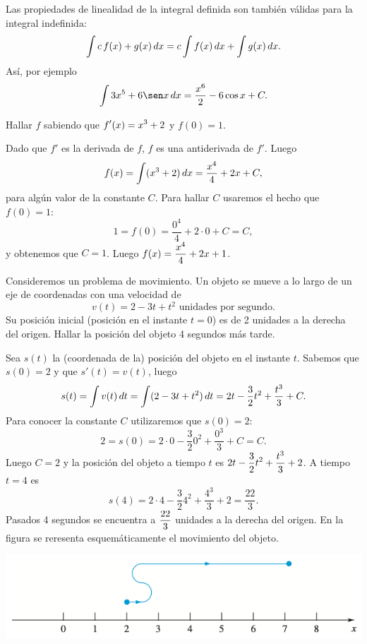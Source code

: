 Las propiedades de linealidad de la integral definida son también válidas para la integral indefinida:
\[
\int c\, f(x)+g(x)\,dx = c \int f(x)\,dx + \int g(x)\,dx.
\]
Así, por ejemplo
\[
\int 3x^5 + 6 \sen x \dx = \frac{x^6}2 - 6 \cos x + C.
\]

\begin{example}
  Hallar $f$ sabiendo que $\displaystyle f'(x)=x^3+2$ y $f(0)=1$.

  Dado que $f'$ es la derivada de $f$, $f$ es una antiderivada de $f'$. Luego
  \[
  f(x)=\int (x^3+2)\,dx = \frac{x^4}{4}+2x+C ,
  \]
  para algún valor de la constante $C$.
  Para hallar $C$ usaremos el hecho que $f(0)=1$:
  \[
  1=f(0)=\frac{0^4}{4}+2\cdot 0+C = C, 
  \]
  y obtenemos que $C=1$. Luego
  $\displaystyle f(x)= \frac{x^4}{4}+2x+1$.
\end{example}

\begin{example}\label{ej:velocidad}
  Consideremos un problema de movimiento.
  Un objeto se mueve a lo largo de un eje de coordenadas con una velocidad de 
  \[
  v(t)=2-3t+t^2\text{\ \ unidades por segundo.}
  \]
  Su posición inicial (posición en el instante $t=0$) es de 2 unidades a la derecha del origen.
  Hallar la posición del objeto 4 segundos más tarde.

  Sea $s(t)$ la (coordenada de la) posición del objeto en el instante $t$.
  Sabemos que $s(0)=2$ y que $s'(t)=v(t)$, luego
  \[
  s(t)=\int v(t)\,dt = \int (2-3t+t^2 )\,dt = 2t -\frac32 t^2 +\frac{t^3}3 + C.
  \]
  Para conocer la constante $C$ utilizaremos que $s(0)=2$:
  \[
  2=s(0)=2\cdot 0 -\frac32 0^2 +\frac{0^3}3 + C = C.
  \]
  Luego $C=2$ y la posición del objeto a tiempo $t$ es $\displaystyle 2t -\frac32 t^2 +\frac{t^3}3 +2$. A tiempo $t=4$ es 
  \[
  s(4)=2\cdot 4 -\frac32 4^2 +\frac{4^3}3 +2=\frac{22}3.
  \]
  Pasados 4 segundos se encuentra a $\displaystyle\frac{22}3$ unidades a la derecha del origen.
  En la figura se reresenta esquemáticamente el movimiento del objeto.

  \begin{center}
    \includegraphics[width=.7\textwidth]{pics/movimiento.png}
  \end{center}

\end{example}

